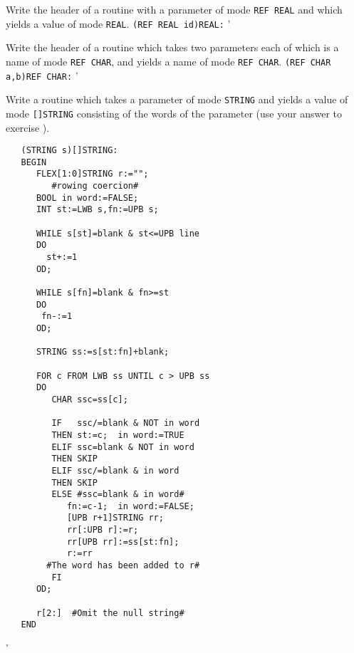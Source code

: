 \begin{exercise}
\item Write the header of a routine with a parameter of mode
\verb|REF REAL| and which yields a value of mode \verb|REAL|.
\ans \verb|(REF REAL id)REAL:|
'
\item Write the header of a routine which takes two parameters each of
which is a name of mode \verb|REF CHAR|, and yields a name of mode
\verb|REF CHAR|. \ans \verb|(REF CHAR a,b)REF CHAR:|
'
\item Write a routine which takes a parameter of mode \verb|STRING| and
yields a value of mode \verb|[]STRING| consisting of the words of the
parameter (use your answer to exercise ).
\ans \ %
\begin{verbatim}
   (STRING s)[]STRING:
   BEGIN
      FLEX[1:0]STRING r:="";
         #rowing coercion#
      BOOL in word:=FALSE;
      INT st:=LWB s,fn:=UPB s;

      WHILE s[st]=blank & st<=UPB line
      DO
        st+:=1
      OD;

      WHILE s[fn]=blank & fn>=st
      DO
       fn-:=1
      OD;

      STRING ss:=s[st:fn]+blank;

      FOR c FROM LWB ss UNTIL c > UPB ss
      DO
         CHAR ssc=ss[c];

         IF   ssc/=blank & NOT in word
         THEN st:=c;  in word:=TRUE
         ELIF ssc=blank & NOT in word
         THEN SKIP
         ELIF ssc/=blank & in word
         THEN SKIP
         ELSE #ssc=blank & in word#
            fn:=c-1;  in word:=FALSE;
            [UPB r+1]STRING rr;
            rr[:UPB r]:=r;
            rr[UPB rr]:=ss[st:fn];
            r:=rr
        #The word has been added to r#
         FI
      OD;

      r[2:]  #Omit the null string#
   END
\end{verbatim}
'
\end{exercise}

